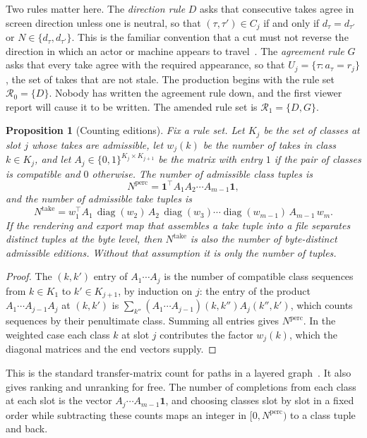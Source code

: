\documentclass[11pt,twoside,openright]{book}
\theoremstyle{plain}
\newtheorem{proposition}[theorem]{Proposition}
\theoremstyle{definition}
\theoremstyle{remark}
\newcommand{\one}{\mathbf{1}}
\DeclareMathOperator{\diag}{diag}
\begin{document}
Two rules matter here. The \emph{direction rule} $D$ asks that consecutive takes agree in screen direction unless one is neutral, so that $(\tau,\tau')\in C_j$ if and only if $d_\tau=d_{\tau'}$ or $N\in\{d_\tau,d_{\tau'}\}$. This is the familiar convention that a cut must not reverse the direction in which an actor or machine appears to travel~\cite{bordwell1985classical}. The \emph{agreement rule} $G$ asks that every take agree with the required appearance, so that $U_j=\{\tau:a_\tau=r_j\}$, the set of takes that are not stale. The production begins with the rule set $\mathcal R_0=\{D\}$. Nobody has written the agreement rule down, and the first viewer report will cause it to be written. The amended rule set is $\mathcal R_1=\{D,G\}$.

\begin{proposition}[Counting editions]\label{prop:count}
Fix a rule set. Let $K_j$ be the set of classes at slot $j$ whose takes are admissible, let $w_j(k)$ be the number of takes in class $k\in K_j$, and let $A_j\in\{0,1\}^{K_j\times K_{j+1}}$ be the matrix with entry $1$ if the pair of classes is compatible and $0$ otherwise. The number of admissible class tuples is
\[
N^{\mathrm{perc}}=\one^{\!\top}A_1A_2\cdots A_{m-1}\one,
\]
and the number of admissible take tuples is
\[
N^{\mathrm{take}}=w_1^{\!\top}A_1\,\diag(w_2)\,A_2\,\diag(w_3)\cdots\diag(w_{m-1})\,A_{m-1}\,w_m .
\]
If the rendering and export map that assembles a take tuple into a file separates distinct tuples at the byte level, then $N^{\mathrm{take}}$ is also the number of byte-distinct admissible editions. Without that assumption it is only the number of tuples.
\end{proposition}

\begin{proof}
The $(k,k')$ entry of $A_1\cdots A_{j}$ is the number of compatible class sequences from $k\in K_1$ to $k'\in K_{j+1}$, by induction on $j$: the entry of the product $A_1\cdots A_{j-1}A_j$ at $(k,k')$ is $\sum_{k''}(A_1\cdots A_{j-1})(k,k'')A_j(k'',k')$, which counts sequences by their penultimate class. Summing all entries gives $N^{\mathrm{perc}}$. In the weighted case each class $k$ at slot $j$ contributes the factor $w_j(k)$, which the diagonal matrices and the end vectors supply.
\end{proof}

This is the standard transfer-matrix count for paths in a layered graph~\cite{stanley2012ec1}. It also gives ranking and unranking for free. The number of completions from each class at each slot is the vector $A_j\cdots A_{m-1}\one$, and choosing classes slot by slot in a fixed order while subtracting these counts maps an integer in $[0,N^{\mathrm{perc}})$ to a class tuple and back.
\end{document}
